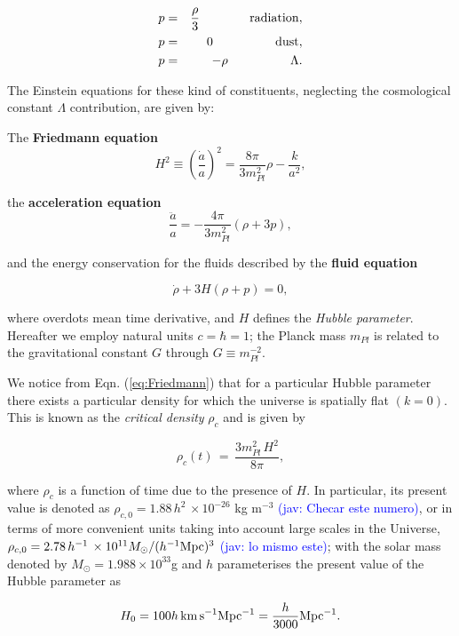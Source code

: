 \documentclass{rmaa}
\def\beq{\begin{equation}}
\def\eeq{\end{equation}}
\newcommand{\jav}[1]{\textcolor{blue}{(jav: #1)}}
\begin{document}
\begin{eqnarray}
p&=& \frac{\rho}{3} \qquad \qquad {\rm radiation}, \nonumber \\
p&=&0 \qquad \qquad \quad {\rm dust}, \\
p&=&-\rho \qquad \qquad \quad \Lambda. \nonumber
\end{eqnarray}

\noindent
The Einstein equations for these kind of constituents, neglecting the cosmological 
constant $\Lambda$ contribution, are given by:

\noindent
The {\bf Friedmann equation}
\beq\label{eq:Friedmann}
H^2  \equiv  \left(\frac{\dot a}{a} \right)^2 = \frac{8\pi}{3 m^2_{Pl}} \rho  - \frac{k}{a^2}, 
\eeq

\noindent
the {\bf acceleration equation}
\beq \label{eq:Acce}
\frac{\ddot{a}}{a}  =   - \frac{4\pi }{3 m^2_{Pl}} (\rho +3p),
\eeq

\noindent
and the energy conservation for the fluids described by the {\bf fluid equation}

\begin{equation}
\dot \rho + 3H(\rho + p)=0,
\end{equation}

\noindent
where overdots mean time derivative, and $H$ defines the \textit{Hubble parameter}. Hereafter we employ natural units
$c=\hbar=1$; the Planck mass $m_{Pl}$ is related to the gravitational constant $G$ through $G\equiv m^{-2}_{Pl}$.


We notice from Eqn. (\ref{eq:Friedmann}) that for a particular 
Hubble parameter there exists a particular density for which the universe is spatially flat 
$(k=0)$. This is known as the {\it critical density} $\rho_c$ and is given by

\beq
\rho_c(t)\, =\, \frac{3 m^2_{Pl} \,H^2}{8\pi},
\eeq

\noindent
where $\rho_c$ is a function of time due to the presence of $H$. In particular, its present 
value is denoted as $\rho_{c,0}=1.88\, h^2\, \times 10^{-26}$ kg m$^{-3}$ \jav{Checar este numero}, 
or in terms of more  convenient units taking into account large scales in the 
Universe,   $\rho_{c,0}= 2.78 \, h^{-1}\, \times 10^{11} M_{\odot} /(h^{-1} {\rm Mpc})^3 $ \jav{lo mismo este};
with the solar mass denoted by $M_{\odot}=1.988\times 10^{33}$g
 and $h$ parameterises the present value of the Hubble parameter as

\beq
H_0 = 100 h\, {\rm km\,s}^{-1}{\rm Mpc}^{-1} = \frac{h}{3000}{\rm Mpc}^{-1}.
\eeq
\end{document}
